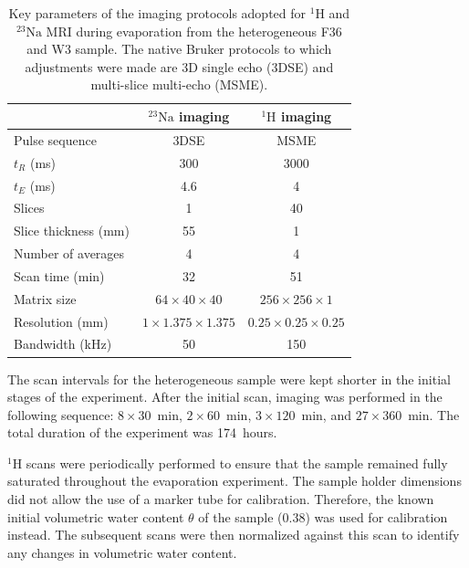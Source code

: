 \documentclass[final]{agujournal2019}
\newcommand{\NaIso}{\ensuremath{^{23}\mathrm{Na}}}
\newcommand{\HIso}{\ensuremath{^{1}\mathrm{H}}}
\begin{document}
\begin{table}[t]
\centering
\caption{Key parameters of the imaging protocols adopted for \HIso{} and
\NaIso{} MRI during evaporation from the heterogeneous F36 and W3 sample. The
native Bruker protocols to which adjustments were made are 3D single echo
(3DSE) and multi-slice multi-echo (MSME).}
\label{tab:imaging}
\begin{tabular}{lcc}
\toprule
 & \NaIso{} imaging & \HIso{} imaging \\
\midrule
Pulse sequence          & 3DSE & MSME \\
$t_R$ (ms)              & 300 & 3000 \\
$t_E$ (ms)              & 4.6 & 4 \\
Slices                  & 1 & 40 \\
Slice thickness (mm)    & 55 & 1 \\
Number of averages      & 4 & 4 \\
Scan time (min)         & 32 & 51 \\
Matrix size             & $64\times40\times40$ & $256\times256\times1$ \\
Resolution (mm)         & $1\times1.375\times1.375$ & $0.25\times0.25\times0.25$ \\
Bandwidth (kHz)         & 50 & 150 \\
\bottomrule
\end{tabular}
\end{table}

The scan intervals for the heterogeneous sample were kept shorter in the initial
stages of the experiment. After the initial scan, imaging was performed in the
following sequence: $8\times30$~min, $2\times60$~min, $3\times120$~min, and
$27\times360$~min. The total duration of the experiment was 174~hours.

\HIso{} scans were periodically performed to ensure that the sample remained
fully saturated throughout the evaporation experiment. The sample holder
dimensions did not allow the use of a marker tube for calibration. Therefore,
the known initial volumetric water content $\theta$ of the sample (0.38) was used
for calibration instead. The subsequent scans were then normalized against this
scan to identify any changes in volumetric water content.
\end{document}
